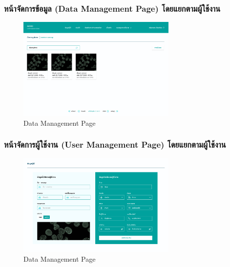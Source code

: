\subsubsection{หน้าจัดการข้อมูล (Data Management Page) โดยแยกตามผู้ใช้งาน}
\begin{figure}[h]
    \begin{center}
        \includegraphics[width=0.7\textwidth]{img/admin/4-admin-image-manamgement-byuser.png}
    \end{center}
    \caption[Poem]{Data Management Page}
    \label{fig:data_management_byuser}
\end{figure}

\newpage
\subsubsection{หน้าจัดการผู้ใช้งาน (User Management Page) โดยแยกตามผู้ใช้งาน}
\begin{figure}[h]
    \begin{center}
        \includegraphics[width=0.7\textwidth]{img/admin/5-admin-edit-user-page.png}
    \end{center}
    \caption[Poem]{Data Management Page}
    \label{fig:data_management_bydisease}
\end{figure}